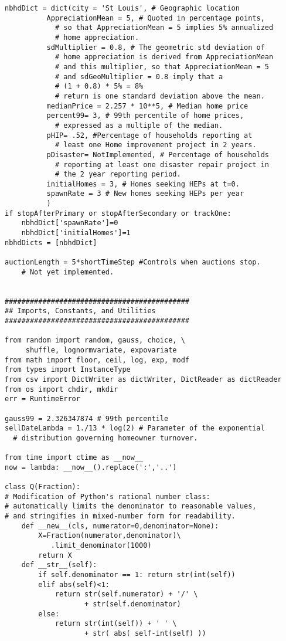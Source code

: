 \begin{lstlisting}
nbhdDict = dict(city = 'St Louis', # Geographic location
          AppreciationMean = 5, # Quoted in percentage points,
            # so that AppreciationMean = 5 implies 5% annualized
            # home appreciation.
          sdMultiplier = 0.8, # The geometric std deviation of
            # home appreciation is derived from AppreciationMean
            # and this multiplier, so that AppreciationMean = 5
            # and sdGeoMultiplier = 0.8 imply that a
            # (1 + 0.8) * 5% = 8%
            # return is one standard deviation above the mean.                
          medianPrice = 2.257 * 10**5, # Median home price
          percent99= 3, # 99th percentile of home prices,
            # expressed as a multiple of the median.
          pHIP= .52, #Percentage of households reporting at
            # least one Home improvement project in 2 years.
          pDisaster= NotImplemented, # Percentage of households
            # reporting at least one disaster repair project in
            # the 2 year reporting period.
          initialHomes = 3, # Homes seeking HEPs at t=0.
          spawnRate = 3 # New homes seeking HEPs per year
          )
if stopAfterPrimary or stopAfterSecondary or trackOne:
    nbhdDict['spawnRate']=0
    nbhdDict['initialHomes']=1
nbhdDicts = [nbhdDict]

auctionLength = 5*shortTimeStep #Controls when auctions stop.
    # Not yet implemented.


############################################
## Imports, Constants, and Utilities
############################################

from random import random, gauss, choice, \
     shuffle, lognormvariate, expovariate
from math import floor, ceil, log, exp, modf
from types import InstanceType
from csv import DictWriter as dictWriter, DictReader as dictReader
from os import chdir, mkdir
err = RuntimeError

gauss99 = 2.326347874 # 99th percentile
sellDateLambda = 1./13 * log(2) # Parameter of the exponential
  # distribution governing homeowner turnover.

from time import ctime as __now__
now = lambda: __now__().replace(':','..')

class Q(Fraction):
# Modification of Python's rational number class:
# automatically limits the denominator to reasonable values,
# and stringifies in mixed-number form for readability.
    def __new__(cls, numerator=0,denominator=None):
        X=Fraction(numerator,denominator)\
           .limit_denominator(1000)
        return X
    def __str__(self):
        if self.denominator == 1: return str(int(self))
        elif abs(self)<1:
            return str(self.numerator) + '/' \
                   + str(self.denominator)
        else:
            return str(int(self)) + ' ' \
                   + str( abs( self-int(self) ))


\end{lstlisting}
